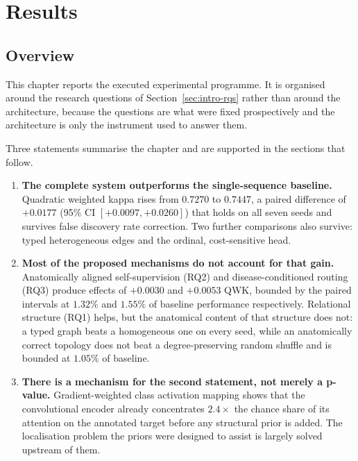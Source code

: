 \documentclass[12pt,a4paper]{report}
\begin{document}
\chapter{Results}
\label{ch:results}

\section{Overview}
\label{sec:results-overview}

This chapter reports the executed experimental programme. It is organised around
the research questions of Section~\ref{sec:intro-rqs} rather than around the
architecture, because the questions are what were fixed prospectively and the
architecture is only the instrument used to answer them.

Three statements summarise the chapter and are supported in the sections that
follow.

\begin{enumerate}
  \item \textbf{The complete system outperforms the single-sequence baseline.}
  Quadratic weighted kappa rises from $0.7270$ to $0.7447$, a paired difference
  of $+0.0177$ (95\% CI $[+0.0097, +0.0260]$) that holds on all seven seeds and
  survives false discovery rate correction. Two further comparisons also survive:
  typed heterogeneous edges and the ordinal, cost-sensitive head.

  \item \textbf{Most of the proposed mechanisms do not account for that gain.}
  Anatomically aligned self-supervision (RQ2) and disease-conditioned routing
  (RQ3) produce effects of $+0.0030$ and $+0.0053$ QWK, bounded by the paired
  intervals at $1.32\%$ and $1.55\%$ of baseline performance respectively.
  Relational structure (RQ1) helps, but the anatomical content of that structure
  does not: a typed graph beats a homogeneous one on every seed, while an
  anatomically correct topology does not beat a degree-preserving random shuffle
  and is bounded at $1.05\%$ of baseline.

  \item \textbf{There is a mechanism for the second statement, not merely a
  p-value.} Gradient-weighted class activation mapping shows that the
  convolutional encoder already concentrates $2.4\times$ the chance share of its
  attention on the annotated target before any structural prior is added. The
  localisation problem the priors were designed to assist is largely solved
  upstream of them.
\end{enumerate}
\end{document}
